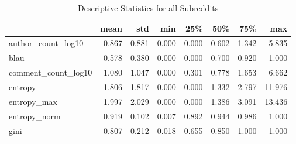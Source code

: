 \begin{table}
\centering
\begin{tabular}{lrrrrrrr}
\toprule
{} &  mean &   std &   min &   25\% &   50\% &   75\% &    max \\
\midrule
author\_count\_log10  & 0.867 & 0.881 & 0.000 & 0.000 & 0.602 & 1.342 &  5.835 \\
blau                & 0.578 & 0.380 & 0.000 & 0.000 & 0.700 & 0.920 &  1.000 \\
comment\_count\_log10 & 1.080 & 1.047 & 0.000 & 0.301 & 0.778 & 1.653 &  6.662 \\
entropy             & 1.806 & 1.817 & 0.000 & 0.000 & 1.332 & 2.797 & 11.976 \\
entropy\_max         & 1.997 & 2.029 & 0.000 & 0.000 & 1.386 & 3.091 & 13.436 \\
entropy\_norm        & 0.919 & 0.102 & 0.007 & 0.892 & 0.944 & 0.986 &  1.000 \\
gini                & 0.807 & 0.212 & 0.018 & 0.655 & 0.850 & 1.000 &  1.000 \\
\bottomrule
\end{tabular}
\caption{Descriptive Statistics for all Subreddits}
\label{table/all}
\end{table}